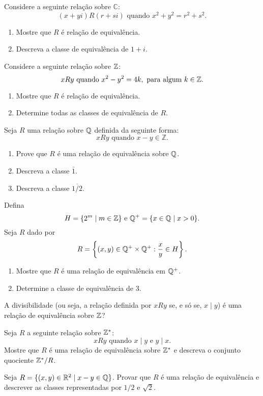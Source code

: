 \documentclass[12pt]{exam}
\begin{document}
\questao Considere a seguinte rela{\c c}{\~a}o sobre $\mathbb{C}$:
\[
(x+yi)R(r+si) \mbox{ quando } x^2+y^2=r^2+s^2.
\]
\begin{enumerate}[label={\alph*})]
\item Mostre que $R$ {\'e} rela{\c c}{\~a}o de equival{\^e}ncia.
\item Descreva a classe de equival{\^e}ncia de $1+i$.
\end{enumerate}

\vspace{.3cm}

\questao Considere a seguinte rela\c{c}\~ao sobre $\mathbb{Z}$:
\[
	xRy \mbox{ quando }  x^2 - y^2 = 4k, \mbox{ para algum } k \in \mathbb{Z}.
\]
\begin{enumerate}[label={\alph*})]
	\item Mostre que $R$ {\'e} rela{\c c}{\~a}o de equival{\^e}ncia.
	\item Determine todas as classes de equival\^encia de $R$.
\end{enumerate}
\vspace{.3cm}

\questao Seja $R$ uma rela{\c c}{\~a}o sobre $\mathbb{Q}$
definida da seguinte forma:
\[
xRy \mbox{ quando } x-y \in \mathbb{Z}.
\]
\begin{enumerate}[label={\alph*})]
\item Prove que $R$ {\'e} uma rela{\c c}{\~a}o de equival{\^e}ncia sobre $\mathbb{Q}$.
\item Descreva a classe $\bar{1}$.
\item Descreva a classe $\overline{1/2}$.
\end{enumerate}

\vspace{.3cm}

\questao Defina
\[
	H = \{2^m \mid m \in \mathbb{Z}\} \mbox{ e } \mathbb{Q}^+ = \{x \in \mathbb{Q} \mid x > 0\}.
\]
Seja $R$ dado por
\[
	R = \left\{(x,y) \in \mathbb{Q}^+\times \mathbb{Q}^+ : \frac{x}{y} \in H\right\}.
\]
\begin{enumerate}[label={\alph*})]
	\item Mostre que $R$ \'e uma rela\c{c}\~ao de equival\^encia em $\mathbb{Q}^+$.
	\item Determine a classe de equival\^encia de $3$.
\end{enumerate}
\vspace{.3cm}

\questao A divisibilidade (ou seja, a rela{\c c}{\~a}o definida por $xRy$ se, e s{\'o}
se, $x \mid y$) {\'e} uma rela{\c c}{\~a}o de equival{\^e}ncia sobre $\mathbb{Z}$?

\vspace{.3cm}

\questao Seja $R$ a seguinte rela{\c c}{\~a}o sobre $\mathbb{Z}^*$:
\[
xRy \mbox{ quando } x\mid y \mbox{ e } y\mid x.
\]
Mostre que $R$ {\'e} uma rela{\c c}{\~a}o de equival{\^e}ncia sobre $\mathbb{Z}^*$ e
descreva o conjunto quociente $\mathbb{Z}^*/R$.

\vspace{.3cm}

\questao Seja $R = \{ (x, y) \in \mathbb{R}^2 \mid x - y \in \mathbb{Q}\}$. Provar que $R$ {\'e} uma rela{\c c}{\~a}o de equival{\^e}ncia e descrever as classes representadas por $1/2$ e $\sqrt{2}$.
\end{document}
